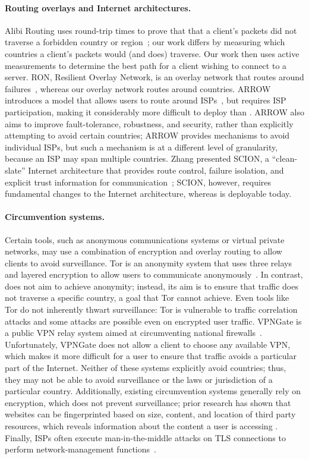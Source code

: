 \paragraph{Routing overlays and Internet architectures.} Alibi Routing uses
round-trip times to prove that that a client's packets did  not traverse a
forbidden country or region~\cite{levin2015alibi}; our work differs by
measuring  which countries a client's packets would (and does) traverse.  Our
work then  uses active measurements to determine the best path for a client
wishing  to connect to a server.  RON, Resilient Overlay Network, is an
overlay network that  routes around failures~\cite{andersen2001resilient}, whereas our overlay network
routes around countries.  ARROW introduces a
model that allows users to route around ISPs~\cite{peter2015one}, but requires
ISP participation, making it considerably more difficult to deploy than
\system{}. ARROW also aims to improve fault-tolerance, robustness, and
security, rather than explicitly attempting to avoid certain countries; ARROW
provides mechanisms to avoid individual ISPs, but such a mechanism is at a
different level of granularity, because an ISP may span multiple countries.
Zhang \ea{} presented SCION, a ``clean-slate'' Internet architecture that
provides route control, failure isolation, and explicit trust information for
communication~\cite{zhang2011scion}; SCION, however, requires fundamental
changes to the Internet architecture, whereas \system{} is deployable today.


\paragraph{Circumvention systems.}  Certain tools, such as anonymous
communications systems or virtual private networks, may use a combination of
encryption and overlay routing to allow clients to avoid surveillance. Tor is
an anonymity system that uses three relays and layered encryption to allow
users to communicate anonymously~\cite{dingledine2004tor}.  In contrast,
\system{} does not aim to achieve anonymity; instead, its aim is to ensure
that traffic does not traverse a specific  country, a goal that Tor cannot
achieve.  Even tools like Tor do not inherently thwart surveillance: Tor is
vulnerable to traffic correlation attacks and some attacks are possible even
on encrypted user traffic. VPNGate is a public VPN relay system aimed at
circumventing national firewalls~\cite{nobori2014vpn}. Unfortunately, VPNGate
does not allow a client to choose any available VPN, which makes it more
difficult for a user to ensure that traffic avoids a particular part of the
Internet.  Neither of these systems explicitly avoid countries; thus, they may
not  be able to avoid surveillance or the laws or jurisdiction of a particular
country. Additionally, existing circumvention systems generally rely on
encryption, which does not prevent surveillance; prior research has shown that
websites can be fingerprinted based on size, content, and location of third
party resources, which  reveals information about the content a user is
accessing \cite{what_isps_can_see}.  Finally, ISPs often execute man-in-the-middle attacks on TLS connections to perform network-management
functions~\cite{mitm_isp}.

